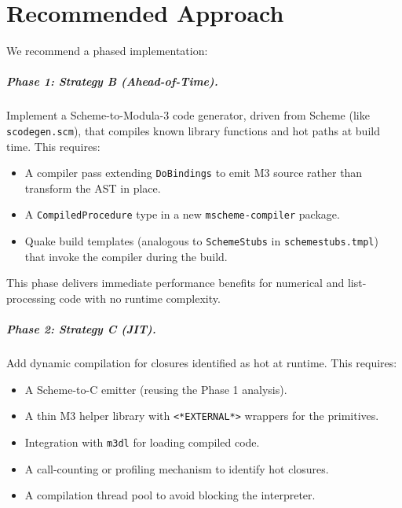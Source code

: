 \documentclass[12pt]{report}
\begin{document}
\chapter{Recommended Approach}
\label{ch:recommendation}

We recommend a phased implementation:

\paragraph{Phase 1: Strategy B (Ahead-of-Time).}
Implement a Scheme-to-Modula-3 code generator, driven from Scheme
(like \texttt{scodegen.scm}), that compiles known library functions
and hot paths at build time.  This requires:

\begin{itemize}
\item A compiler pass extending \texttt{DoBindings} to emit M3 source
  rather than transform the AST in place.
\item A \texttt{CompiledProcedure} type in a new \texttt{mscheme-compiler}
  package.
\item Quake build templates (analogous to \texttt{SchemeStubs} in
  \texttt{schemestubs.tmpl}) that invoke the compiler during the
  build.
\end{itemize}

This phase delivers immediate performance benefits for numerical
and list-processing code with no runtime complexity.

\paragraph{Phase 2: Strategy C (JIT).}
Add dynamic compilation for closures identified as hot at runtime.
This requires:

\begin{itemize}
\item A Scheme-to-C emitter (reusing the Phase 1 analysis).
\item A thin M3 helper library with \texttt{<*EXTERNAL*>} wrappers
  for the primitives.
\item Integration with \texttt{m3dl} for loading compiled code.
\item A call-counting or profiling mechanism to identify hot closures.
\item A compilation thread pool to avoid blocking the interpreter.
\end{itemize}
\end{document}

